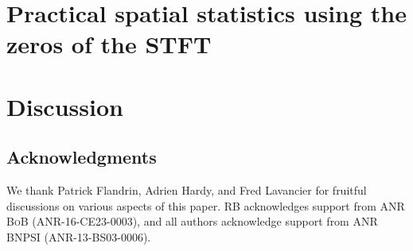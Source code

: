 \documentclass[a4paper,11pt]{article}
\theoremstyle{plain}
\theoremstyle{remark}
\begin{document}
\section{Practical spatial statistics using the zeros of the STFT}
\label{s:stats}



\section{Discussion}
\label{s:discussion}


\subsection*{Acknowledgments}
We thank Patrick Flandrin, Adrien Hardy, and Fred Lavancier for fruitful
discussions on various aspects of this paper. RB acknowledges support from ANR
\textsc{BoB} (ANR-16-CE23-0003), and all authors acknowledge support from
ANR \textsc{BNPSI} (ANR-13-BS03-0006).


\end{document}
